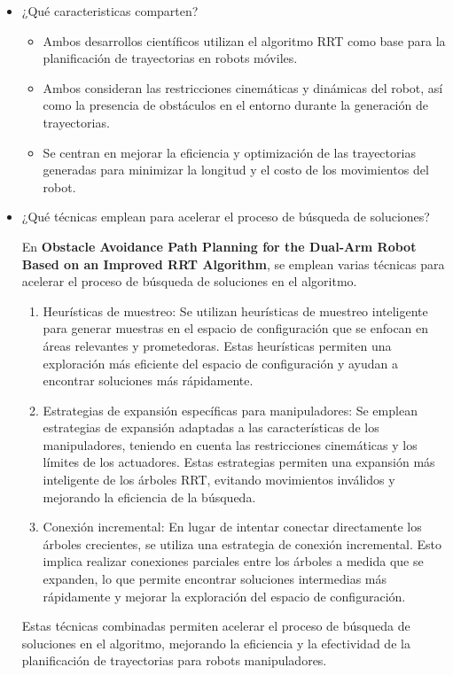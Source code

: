 \documentclass{article}
\begin{document}
\begin{itemize}
\item{¿Qué caracteristicas comparten?}

  \begin{itemize}
  \item Ambos desarrollos científicos utilizan el algoritmo RRT como base para la planificación de trayectorias en robots móviles.
  \item Ambos consideran las restricciones cinemáticas y dinámicas del robot, así como la presencia de obstáculos en el entorno durante la generación de trayectorias.
  \item Se centran en mejorar la eficiencia y optimización de las trayectorias generadas para minimizar la longitud y el costo de los movimientos del robot.
  \end{itemize}
  
\item{¿Qué técnicas emplean para acelerar el proceso de búsqueda de soluciones?}

  En \textbf{Obstacle Avoidance Path Planning for the Dual-Arm Robot Based on an Improved RRT Algorithm}, se emplean varias técnicas para acelerar el proceso de búsqueda de soluciones en el algoritmo.

  \begin{enumerate}
  \item Heurísticas de muestreo: Se utilizan heurísticas de muestreo inteligente para generar muestras en el espacio de configuración que se enfocan en áreas relevantes y prometedoras. Estas heurísticas permiten una exploración más eficiente del espacio de configuración y ayudan a encontrar soluciones más rápidamente.
  \item Estrategias de expansión específicas para manipuladores: Se emplean estrategias de expansión adaptadas a las características de los manipuladores, teniendo en cuenta las restricciones cinemáticas y los límites de los actuadores. Estas estrategias permiten una expansión más inteligente de los árboles RRT, evitando movimientos inválidos y mejorando la eficiencia de la búsqueda.
  \item Conexión incremental: En lugar de intentar conectar directamente los árboles crecientes, se utiliza una estrategia de conexión incremental. Esto implica realizar conexiones parciales entre los árboles a medida que se expanden, lo que permite encontrar soluciones intermedias más rápidamente y mejorar la exploración del espacio de configuración.
  \end{enumerate}

  Estas técnicas combinadas permiten acelerar el proceso de búsqueda de soluciones en el algoritmo, mejorando la eficiencia y la efectividad de la planificación de trayectorias para robots manipuladores.\\


\end{itemize}
\end{document}
